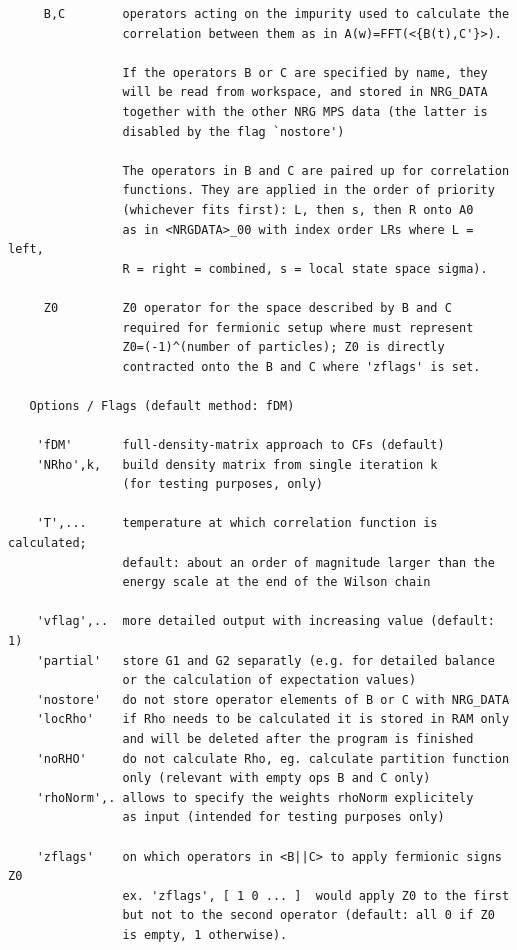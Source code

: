 \documentclass[twoside,12pt]{article}
\begin{document}
\begin{verbatim}
     B,C        operators acting on the impurity used to calculate the
                correlation between them as in A(w)=FFT(<{B(t),C'}>).
 
                If the operators B or C are specified by name, they
                will be read from workspace, and stored in NRG_DATA
                together with the other NRG MPS data (the latter is
                disabled by the flag `nostore')
 
                The operators in B and C are paired up for correlation
                functions. They are applied in the order of priority
                (whichever fits first): L, then s, then R onto A0
                as in <NRGDATA>_00 with index order LRs where L = left,
                R = right = combined, s = local state space sigma).
 
     Z0         Z0 operator for the space described by B and C
                required for fermionic setup where must represent
                Z0=(-1)^(number of particles); Z0 is directly
                contracted onto the B and C where 'zflags' is set.
 
   Options / Flags (default method: fDM)
 
    'fDM'       full-density-matrix approach to CFs (default)
    'NRho',k,   build density matrix from single iteration k
                (for testing purposes, only)
 
    'T',...     temperature at which correlation function is calculated;
                default: about an order of magnitude larger than the
                energy scale at the end of the Wilson chain
 
    'vflag',..  more detailed output with increasing value (default: 1)
    'partial'   store G1 and G2 separatly (e.g. for detailed balance
                or the calculation of expectation values)
    'nostore'   do not store operator elements of B or C with NRG_DATA
    'locRho'    if Rho needs to be calculated it is stored in RAM only
                and will be deleted after the program is finished
    'noRHO'     do not calculate Rho, eg. calculate partition function
                only (relevant with empty ops B and C only)
    'rhoNorm',. allows to specify the weights rhoNorm explicitely
                as input (intended for testing purposes only)
 
    'zflags'    on which operators in <B||C> to apply fermionic signs Z0
                ex. 'zflags', [ 1 0 ... ]  would apply Z0 to the first
                but not to the second operator (default: all 0 if Z0
                is empty, 1 otherwise).
 

\end{verbatim}
\end{document}
